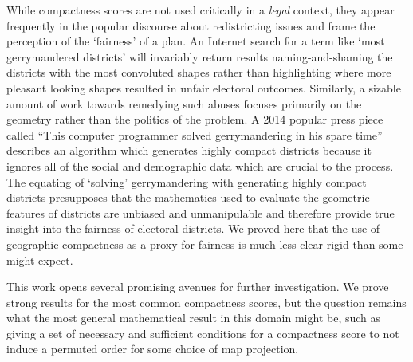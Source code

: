 While compactness scores are not used critically in a \textit{legal} context, they appear frequently in the popular discourse about redistricting issues and frame the perception of the \enquote*{fairness} of a plan.  An Internet search for a term like `most gerrymandered districts' will invariably return results naming-and-shaming the districts with the most convoluted shapes rather than highlighting where more pleasant looking shapes resulted in unfair electoral outcomes. Similarly, a sizable amount of work towards remedying such abuses focuses primarily on the geometry rather than the politics of the problem. A 2014 popular press piece called \enquote{This computer programmer solved gerrymandering in his spare time} \cite{ingraham2014solve} describes an algorithm which generates highly compact districts because it ignores all of the social and demographic data which are crucial to the process.  The equating of `solving' gerrymandering with generating highly compact districts presupposes that the mathematics used to evaluate the geometric features of districts are unbiased and unmanipulable and therefore provide true insight into the fairness of electoral districts.  We proved here that the use of geographic compactness as a proxy for fairness is much less clear rigid than some might expect.




This work opens several promising avenues for further investigation.  We prove strong results for the most common compactness scores, but the question remains what the most general mathematical result in this domain might be, such as giving a set of necessary and sufficient conditions for a compactness score to not induce a permuted order for some choice of map projection.  